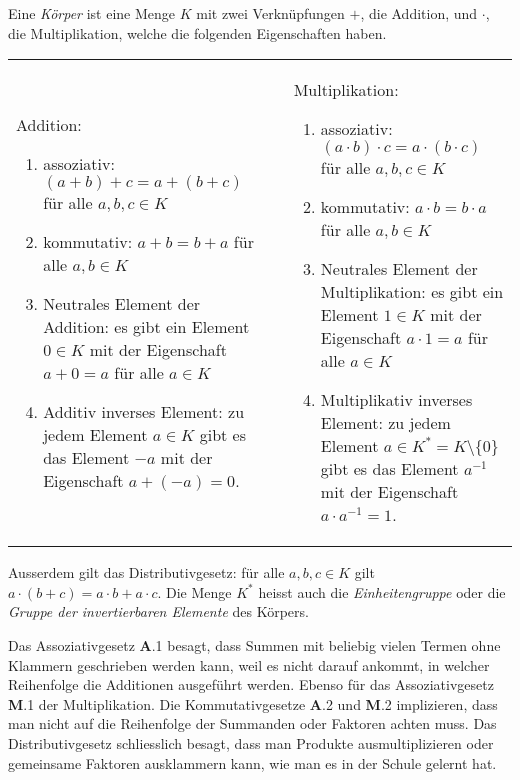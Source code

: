 \begin{definition}
\label{buch:integral:definition:koerper}
Eine {\em Körper} ist eine Menge $K$ mit zwei Verknüpfungen $+$, die Addition,
und $\cdot$, die Multiplikation,
welche die folgenden Eigenschaften haben.
\begin{center}
\renewcommand{\tabcolsep}{0pt}
\begin{tabular}{p{68mm}p{4mm}p{68mm}}
Addition:
\begin{enumerate}[{\bf A}.1)]
\item assoziativ: $(a+b)+c=a+(b+c)$
für alle $a,b,c\in K$
\item kommutativ: $a+b=b+a$
für alle $a,b\in K$
\item Neutrales Element der Addition: es gibt ein Element $0\in K$ mit
der Eigenschaft $a+0=a$ für alle $a\in K$
\item Additiv inverses Element: zu jedem Element $a\in K$ gibt es das Element
$-a$ mit der Eigenschaft $a+(-a)=0$.
\end{enumerate}
&&%
Multiplikation:
\begin{enumerate}[{\bf M}.1)]
\item assoziativ: $(a\cdot b)\cdot c=a\cdot (b\cdot c)$
für alle $a,b,c\in K$
\index{Assoziativgesetz}%
\index{assoziativ}%
\item kommutativ: $a\cdot b=b\cdot a$
für alle $a,b\in K$
\index{Kommutativgesetz}%
\index{kommutativ}%
\item Neutrales Element der Multiplikation: es gibt ein Element $1\in K$ mit
der Eigenschaft $a\cdot 1 =a$ für alle $a\in K$
\index{neutrales Element}%
\item Multiplikativ inverses Element: zu jedem Element
\index{inverses Element}%
$a\in K^*=K\setminus\{0\}$
gibt es das Element $a^{-1}$ mit der Eigenschaft $a\cdot a^{-1}=1$.
\index{Einheitengruppe}%
\index{Gruppe der invertierbaren Elemente}%
\end{enumerate}
\end{tabular}
\end{center}
\vspace{-22pt}
Ausserdem gilt das Distributivgesetz: für alle $a,b,c\in K$ gilt
$a\cdot(b+c)=a\cdot b + a\cdot c$.
%
Die Menge $K^*$ heisst auch die {\em Einheitengruppe} oder die
{\em Gruppe der invertierbaren Elemente} des Körpers.
\end{definition}

Das Assoziativgesetz {\bf A}.1 besagt, dass Summen mit beliebig
vielen Termen ohne Klammern geschrieben werden kann, weil es nicht
darauf ankommt, in welcher Reihenfolge die Additionen ausgeführt werden.
Ebenso für das Assoziativgesetz {\bf M}.1 der Multiplikation.
Die Kommutativgesetze {\bf A}.2 und {\bf M}.2 implizieren, dass man
nicht auf die Reihenfolge der Summanden oder Faktoren achten muss.
Das Distributivgesetz schliesslich besagt, dass man Produkte ausmultiplizieren
oder gemeinsame Faktoren ausklammern kann, wie man es in der Schule
gelernt hat.

